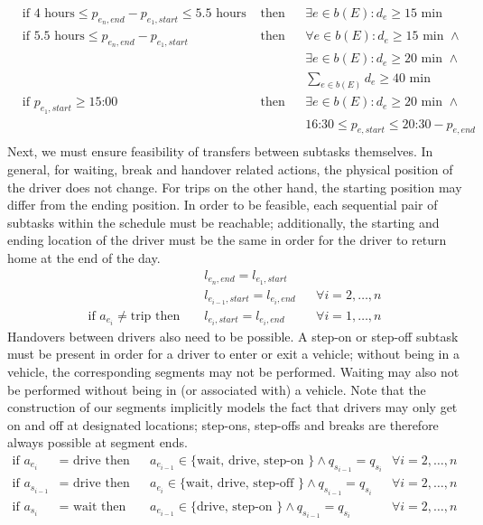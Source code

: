 \documentclass[]{article}
\begin{document}
\begin{align}
  &\text{if } 4 \text{ hours} \leq p_{e_n,end} - p_{e_1,start} \leq 5.5 \text{ hours}&\text{ then} && \exists e \in b(E) : d_e \geq 15 \text{ min} \\
  &\text{if } 5.5 \text{ hours} \leq p_{e_n,end} - p_{e_1,start} &\text{ then} && \forall e \in b(E) : d_e \geq 15\text{ min } \land \\
  &&&& \exists e \in b(E) : d_e \geq 20 \text{ min } \land \\
  &&&& \sum_{e \in b(E)}d_e \geq 40 \text{ min} \\
  &\text{if } p_{e_1,start} \geq \text{15:00} &\text{ then} && \exists e \in b(E) : d_e \geq 20 \text{ min } \land \\
  &&&& \text{16:30} \leq p_{e,start} \leq \text{20:30} - p_{e,end}  \\
\end{align}
Next, we must ensure feasibility of transfers between subtasks themselves. In general, for waiting, break and handover related actions, the physical position of the driver does not change. For trips on the other hand, the starting position may differ from the ending position. In order to be feasible, each sequential pair of subtasks within the schedule must be reachable; additionally, the starting and ending location of the driver must be the same in order for the driver to return home at the end of the day.
\begin{align}
  && l_{e_n,end} = l_{e_1,start} && \\
  && l_{e_{i-1},start} = l_{e_i,end} && \forall i = 2, \dots, n \\
  \text{if } a_{e_i} \neq \text{trip} \text{ then } && l_{e_i,start} = l_{e_i,end} && \forall i = 1, \dots, n
\end{align}
Handovers between drivers also need to be possible. A step-on or step-off subtask must be present in order for a driver to enter or exit a vehicle; without being in a vehicle, the corresponding segments may not be performed. Waiting may also not be performed without being in (or associated with) a vehicle. Note that the construction of our segments implicitly models the fact that drivers may only get on and off at designated locations; step-ons, step-offs and breaks are therefore always possible at segment ends.
\begin{align}
  \text{if } a_{e_i} &= \text{ drive}\text{ then} &&a_{e_{i-1}} \in \text{\{ wait, drive, step-on \}} \land q_{s_{i-1}} = q_{s_{i}} && \forall i = 2, \dots, n \\
  \text{if } a_{s_{i-1}} &= \text{ drive}\text{ then} &&a_{e_{i}} \in \text{\{ wait, drive, step-off \}} \land q_{s_{i-1}} = q_{s_{i}} && \forall i = 2, \dots, n \\
  \text{if } a_{s_{i}} &= \text{ wait}\text{ then} &&a_{e_{i-1}} \in \text{\{ drive, step-on \}} \land q_{s_{i-1}} = q_{s_{i}} && \forall i = 2, \dots, n
\end{align}
\end{document}
